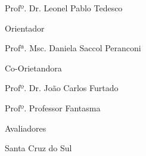 \begin{titlepage}
\thispagestyle{empty}
	\begin{center}
	\par \vspace{100pt} {\textsc \nomedocurso} %
	\par \vspace{100pt} {\nomedoaluno} %
	\par \vspace{4cm}{\textbf{\textsc{\titulo}}} %
	\vspace{2cm}
	\begin{center}
	Profº. Dr. Leonel Pablo Tedesco

	Orientador	

	Profª. Msc. Daniela Saccol Peranconi
	
	Co-Orietandora
	\end{center}
	\vspace{1cm}
	\begin{center}
	Profº. Dr. João Carlos Furtado
	
	Profº. Professor Fantasma
		
	Avaliadores		
	\end{center}
	\vspace{2cm}
	\par \vfill {{Santa Cruz do Sul}\\ {\the\year}}
	\end{center}
\end{titlepage}
